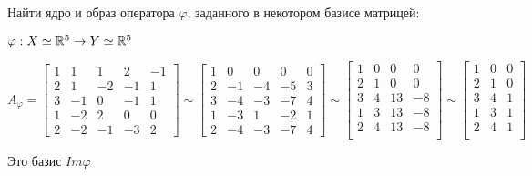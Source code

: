 \begin{example}
    Найти ядро и образ оператора $\varphi$, заданного в некотором базисе матрицей:

    $\varphi : X\simeq \mathbb{R}^5 \to Y\simeq \mathbb{R}^5$

    $$A_\varphi = \begin{bmatrix}
        1 & 1 & 1 & 2 & -1 \\
        2 & 1 & -2 & -1 & 1 \\
        3 & -1 & 0 & -1 & 1 \\
        1 & -2 & 2 & 0 & 0 \\
        2 & -2 & -1 & -3 & 2
    \end{bmatrix} \sim \begin{bmatrix}
        1 & 0 & 0 & 0 & 0 \\
        2 & -1 & -4 & -5 & 3\\
        3 & -4 & -3 & -7 & 4 \\
        1 & -3 & 1 & -2 & 1 \\
        2 & -4 & -3 & -7 & 4
    \end{bmatrix} \sim \begin{bmatrix}
        1 & 0 & 0 & 0 \\
        2 & 1 & 0 & 0 \\
        3 & 4 & 13 & -8\\
        1 & 3 & 13 & -8\\
        2 & 4 & 13 & -8\\
    \end{bmatrix}\sim\begin{bmatrix}
        1 & 0 & 0 \\
        2 & 1 & 0 \\
        3 & 4 & 1 \\
        1 & 3 & 1 \\
        2 & 4 & 1 \\
    \end{bmatrix}$$

    Это базис $Im \varphi$
\end{example}

